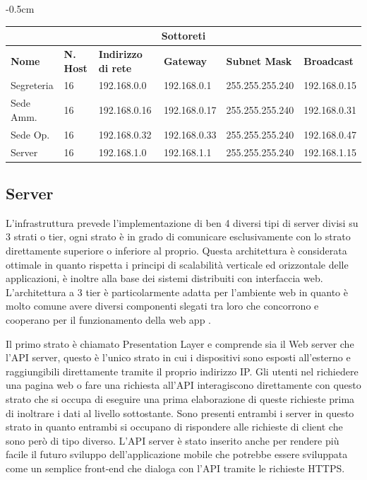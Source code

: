 \begin{center}
    \addtolength{\leftskip} {-0.5cm}
    \begin{tabular}{ |p{2.1cm}|p{1cm}|p{2.1cm}|p{2.1cm}|p{2.7cm}|p{2.1cm}| } 
    \hline
    \multicolumn{6}{|c|}{\large\textbf{Sottoreti}} \\
    \hline
    \textbf{Nome} & \textbf{N. Host} & \textbf{Indirizzo di rete} & \textbf{Gateway} & \textbf{Subnet Mask} & \textbf{Broadcast} \\
    \hline
    Segreteria & 16 & 192.168.0.0 & 192.168.0.1 & 255.255.255.240 & 192.168.0.15 \\
    Sede Amm. & 16 & 192.168.0.16 & 192.168.0.17 & 255.255.255.240 & 192.168.0.31 \\
    Sede Op. & 16 & 192.168.0.32 & 192.168.0.33 & 255.255.255.240 & 192.168.0.47 \\
    Server & 16 & 192.168.1.0 & 192.168.1.1 & 255.255.255.240 & 192.168.1.15 \\
    \hline
    \end{tabular}
\end{center}
\subsection{Server}
L'infrastruttura prevede l'implementazione di ben 4 diversi tipi di server divisi su 3 strati o tier, ogni strato è in grado di comunicare esclusivamente con lo strato direttamente superiore o inferiore al proprio. Questa architettura è considerata ottimale in quanto rispetta i principi di scalabilità verticale ed orizzontale delle applicazioni, è inoltre alla base dei sistemi distribuiti con interfaccia web. L'architettura a 3 tier è particolarmente adatta per l'ambiente web in quanto è molto comune avere diversi componenti slegati tra loro che concorrono e cooperano per il funzionamento della web app \cite{3Tier}. 
\medskip

Il primo strato è chiamato Presentation Layer e comprende sia il Web server che l'API server, questo è l'unico strato in cui i dispositivi sono esposti all'esterno e raggiungibili direttamente tramite il proprio indirizzo IP. Gli utenti nel richiedere una pagina web o fare una richiesta all'API interagiscono direttamente con questo strato che si occupa di eseguire una prima elaborazione di queste richieste prima di inoltrare i dati al livello sottostante. Sono presenti entrambi i server in questo strato in quanto entrambi si occupano di rispondere alle richieste di client che sono però di tipo diverso. L'API server è stato inserito anche per rendere più facile il futuro sviluppo dell'applicazione mobile che potrebbe essere sviluppata come un semplice front-end che dialoga con l'API tramite le richieste HTTPS. 
\medskip

